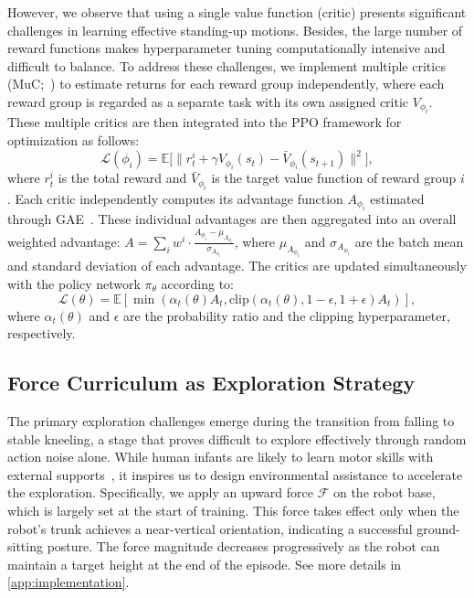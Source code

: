 However, we observe that using a single value function (critic) presents significant challenges in learning effective standing-up motions. Besides, the large number of reward functions makes hyperparameter tuning computationally intensive and difficult to balance. To address these challenges, we implement multiple critics (MuC;~\cite{mysore2022multi,xu2023composite,zargarbashi2024robotkeyframing}) to estimate returns for each reward group independently, where each reward group is regarded as a separate task with its own assigned critic $V_{\phi_i}$. These multiple critics are then integrated into the PPO framework for optimization as follows:
 \begin{equation}
    \mathcal{L}(\phi_i) = \mathbb{E}\big[ \|r_{t}^i + \gamma V_{\phi_i}(s_t) - \bar{V}_{\phi_i}(s_{t+1})\|^2\big],
\end{equation}
where $r_{t}^i$ is the total reward and $\bar{V}_{\phi_i}$ is the target value function of reward group $i$. Each critic independently computes its advantage function $A_{\phi_i}$ estimated through GAE~\cite{Schulman2015HighDimensionalCC}. These individual advantages are then aggregated into an overall weighted advantage: $A = \sum_{i}  w^i \cdot \frac{A_{\phi_i} - \mu_{A_{\phi_i}}}{\sigma_{A_{\phi_i}}} $, where $\mu_{A_{\phi_i}}$ and $\sigma_{A_{\phi_i}}$ are the batch mean and standard deviation of each advantage. The critics are updated simultaneously with the policy network $\pi_\theta$ according to:
\begin{equation}
    \mathcal{L}(\theta) = \mathbb{E} \left[ \min \left( \alpha_t (\theta)A_t, \mathrm{clip}(\alpha_t(\theta), 1-\epsilon, 1+\epsilon)A_t \right) \right],
\end{equation}
where $\alpha_t(\theta)$ and $\epsilon$ are the probability ratio and the clipping hyperparameter, respectively.


\subsection{Force Curriculum as Exploration Strategy}\label{subsec:force}
 The primary exploration challenges emerge during the transition from falling to stable kneeling, a stage that proves difficult to explore effectively through random action noise alone.
While human infants are likely to learn motor skills with external supports~\cite{claxton2012control}, it inspires us to design environmental assistance to accelerate the exploration. Specifically, we apply an upward force $\mathcal{F}$ on the robot base, which is largely set at the start of training. This force takes effect only when the robot's trunk achieves a near-vertical orientation, indicating a successful ground-sitting posture. The force magnitude decreases progressively as the robot can maintain a target height at the end of the episode. See more details in \cref{app:implementation}.

